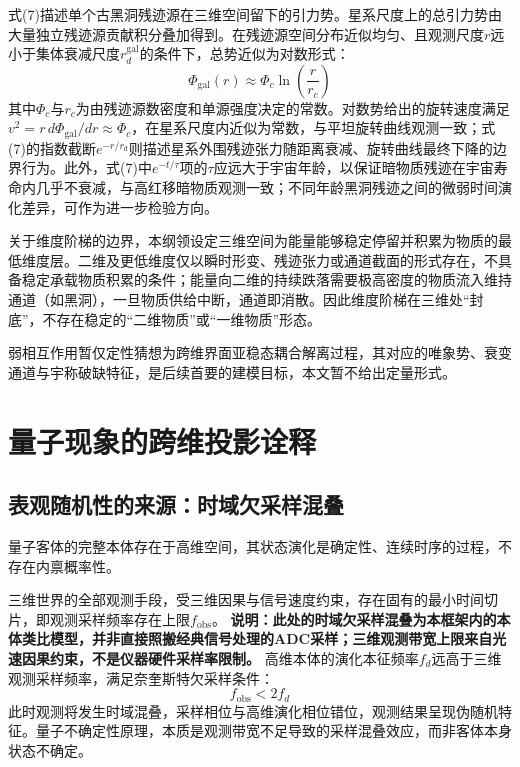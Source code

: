 \documentclass[12pt,a4paper]{ctexart}
\begin{document}
式(7)描述单个古黑洞残迹源在三维空间留下的引力势。星系尺度上的总引力势由大量独立残迹源贡献积分叠加得到。在残迹源空间分布近似均匀、且观测尺度$r$远小于集体衰减尺度$r_d^{\text{gal}}$的条件下，总势近似为对数形式：
\begin{equation*}
\Phi_{\text{gal}}(r) \approx \Phi_c \ln\left(\frac{r}{r_c}\right)
\tag{7b}
\end{equation*}
其中$\Phi_c$与$r_c$为由残迹源数密度和单源强度决定的常数。对数势给出的旋转速度满足$v^2 = r \, d\Phi_{\text{gal}}/dr \approx \Phi_c$，在星系尺度内近似为常数，与平坦旋转曲线观测一致；式(7)的指数截断$e^{-r/r_d}$则描述星系外围残迹张力随距离衰减、旋转曲线最终下降的边界行为。此外，式(7)中$e^{-t/\tau}$项的$\tau$应远大于宇宙年龄，以保证暗物质残迹在宇宙寿命内几乎不衰减，与高红移暗物质观测一致；不同年龄黑洞残迹之间的微弱时间演化差异，可作为进一步检验方向。

关于维度阶梯的边界，本纲领设定三维空间为能量能够稳定停留并积累为物质的最低维度层。二维及更低维度仅以瞬时形变、残迹张力或通道截面的形式存在，不具备稳定承载物质积累的条件；能量向二维的持续跌落需要极高密度的物质流入维持通道（如黑洞），一旦物质供给中断，通道即消散。因此维度阶梯在三维处“封底”，不存在稳定的“二维物质”或“一维物质”形态。

弱相互作用暂仅定性猜想为跨维界面亚稳态耦合解离过程，其对应的唯象势、衰变通道与宇称破缺特征，是后续首要的建模目标，本文暂不给出定量形式\cite{weinberg1967, wilczek2004}。

\section{量子现象的跨维投影诠释}
\subsection{表观随机性的来源：时域欠采样混叠}
量子客体的完整本体存在于高维空间，其状态演化是确定性、连续时序的过程，不存在内禀概率性。

三维世界的全部观测手段，受三维因果与信号速度约束，存在固有的最小时间切片，即观测采样频率存在上限$f_{\text{obs}}$。
\textbf{说明：此处的时域欠采样混叠为本框架内的本体类比模型，并非直接照搬经典信号处理的ADC采样；三维观测带宽上限来自光速因果约束，不是仪器硬件采样率限制。}
高维本体的演化本征频率$f_d$远高于三维观测采样频率，满足奈奎斯特欠采样条件：
\begin{equation}
f_{\text{obs}} < 2 f_d
\end{equation}
此时观测将发生时域混叠，采样相位与高维演化相位错位，观测结果呈现伪随机特征。量子不确定性原理，本质是观测带宽不足导致的采样混叠效应，而非客体本身状态不确定\cite{shannon1949, zeilinger2000}。
\end{document}

